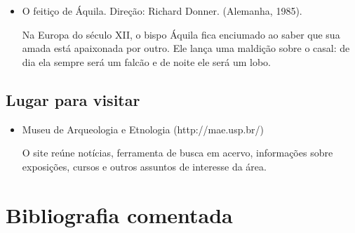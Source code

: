 \documentclass[12pt]{extarticle}
\begin{document}
\begin{itemize}

\item O feitiço de Áquila. Direção: Richard Donner. (Alemanha, 1985).

Na Europa do século XII, o bispo Áquila fica enciumado ao saber que sua
amada está apaixonada por outro. Ele lança uma maldição sobre o casal:
de dia ela sempre será um falcão e de noite ele será um lobo.
\end{itemize}

\subsection{Lugar para visitar}

\begin{itemize}
\item Museu de Arqueologia e Etnologia (http://mae.usp.br/)

O site reúne notícias, ferramenta de busca em acervo, informações sobre
exposições, cursos e outros assuntos de interesse da área.
\end{itemize}

\section{Bibliografia comentada}
\end{document}
